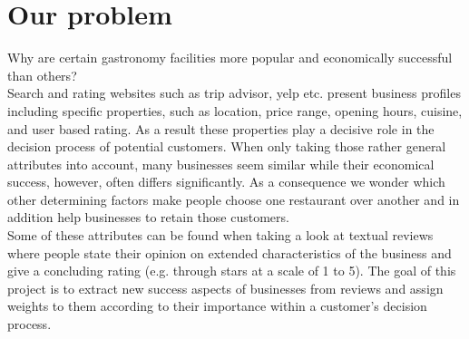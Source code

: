 \section{Our problem}
\label{cha:problem}

Why are certain gastronomy facilities more popular and economically successful than others?\\  
Search and rating websites such as trip advisor, yelp etc. present business profiles including specific properties, such as location, price range, opening hours, cuisine, and user based rating. As a result these properties play a decisive role in the decision process of potential customers. When only taking those rather general attributes into account, many businesses seem similar while their economical success, however, often differs significantly. As a consequence we wonder which other determining factors make people choose one restaurant over another and in addition help businesses to retain those customers. \\
Some of these attributes can be found when taking a look at textual reviews where people state their opinion on extended characteristics of the business and give a concluding rating (e.g. through stars at a scale of 1 to 5). The goal of this project is to extract new success aspects of businesses from reviews and assign weights to them according to their importance within a customer's decision process.\\

